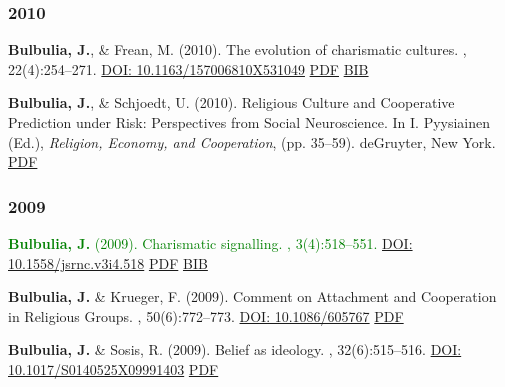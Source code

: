 \documentclass{article}
\begin{document}
\begin{thebibliography}{99}
\subsubsection*{2010}



{\bf Bulbulia, J.}, \& Frean, M. (2010).
\newblock The evolution of charismatic cultures.
, 22(4):254--271. 
\href{https://doi.org/10.1163/157006810X531049}{DOI: 10.1163/157006810X531049}  \href{http://db.tt/3EhwMDv}{PDF} \href{https://scholar.google.co.nz/scholar.bib?q=info:CMgUm8a7Y_QJ:scholar.google.com/&output=citation&scisig=AAGBfm0AAAAAVQPQTOqB9pbHY7FLyLOV1miSoIIZ5shl&scisf=4&hl=en}{BIB}


{\bf Bulbulia, J.}, \& Schjoedt, U. (2010).
\newblock Religious Culture and Cooperative Prediction under Risk: Perspectives from Social Neuroscience.
\newblock In I. Pyysiainen (Ed.), {\em Religion, Economy, and Cooperation},
 (pp. 35--59). deGruyter, New York. \href{http://db.tt/MOZlvjr}{PDF}


\subsubsection*{2009}



\textcolor{Green}{
{\bf Bulbulia, J.} (2009).
\newblock Charismatic signalling.
,
  3(4):518--551.} \newblock 
\href{https://doi.org/10.1558/jsrnc.v3i4.518}{DOI: 10.1558/jsrnc.v3i4.518} \newblock \href{http://db.tt/8IiltRr}{PDF} \href{https://scholar.google.co.nz/scholar.bib?q=info:eUGNRtbVR88J:scholar.google.com/&output=citation&scisig=AAGBfm0AAAAAVQPSkHpPrfY5B1nrjrJcYvQiHbdtIIuQ&scisf=4&hl=en}{BIB}


{\bf Bulbulia, J.} \& Krueger, F. (2009). Comment on Attachment and Cooperation in Religious Groups.
\newblock 
{}, 50(6):772--773.
\href{https://doi.org/10.1086/605767}{DOI: 10.1086/605767} \newblock \href{http://db.tt/MMaLhwQ}{PDF}


{\bf Bulbulia, J.} \& Sosis, R. (2009).
\newblock Belief as ideology.
, 32(6):515--516. 
\href{https://doi.org/10.1017/S0140525X09991403}{DOI: 10.1017/S0140525X09991403} \newblock \href{http://db.tt/I9z2SCY}{PDF}



\end{thebibliography}
\end{document}
